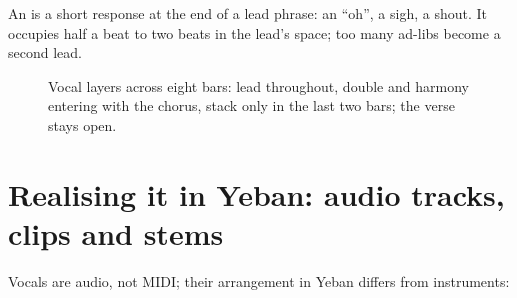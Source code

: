 An  is a short response at the end of a lead phrase: an ``oh'', a sigh, a shout. It occupies half a beat to two beats in the lead's space; too many ad-libs become a second lead.

\begin{figure}[htbp]
  \centering
  \caption{Vocal layers across eight bars: lead throughout, double and harmony entering with the chorus, stack only in the last two bars; the verse stays open.}
  \label{fig:vocal-stack}
\end{figure}

\section{Realising it in Yeban: audio tracks, clips and stems}
\label{sec:vocal-yeban}

Vocals are audio, not MIDI; their arrangement in Yeban differs from instruments:


